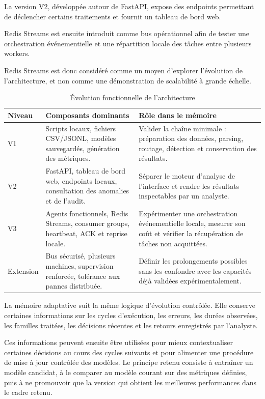 La version V2, développée autour de FastAPI, expose des endpoints permettant de déclencher certains traitements et fournit un tableau de bord web.

Redis Streams est ensuite introduit comme bus opérationnel afin de tester une orchestration événementielle et une répartition locale des tâches entre plusieurs workers.

Redis Streams est donc considéré comme un moyen d'explorer l'évolution de l'architecture, et non comme une démonstration de scalabilité à grande échelle.

\begin{table}[H]
\centering
\caption{Évolution fonctionnelle de l'architecture}
\label{tab:evolution-architecture}
\scriptsize
\begin{tabularx}{\textwidth}{p{2.2cm}p{4.0cm}X}
\toprule
\textbf{Niveau} & \textbf{Composants dominants} & \textbf{Rôle dans le mémoire} \tabularnewline
\midrule
V1 &
Scripts locaux, fichiers CSV/JSONL, modèles sauvegardés, génération des métriques. &
Valider la chaîne minimale : préparation des données, parsing, routage, détection et conservation des résultats. \tabularnewline
V2 &
FastAPI, tableau de bord web, endpoints locaux, consultation des anomalies et de l'audit. &
Séparer le moteur d'analyse de l'interface et rendre les résultats inspectables par un analyste. \tabularnewline
V3 &
Agents fonctionnels, Redis Streams, consumer groups, heartbeat, ACK et reprise locale. &
Expérimenter une orchestration événementielle locale, mesurer son coût et vérifier la récupération de tâches non acquittées. \tabularnewline
Extension &
Bus sécurisé, plusieurs machines, supervision renforcée, tolérance aux pannes distribuée. &
Définir les prolongements possibles sans les confondre avec les capacités déjà validées expérimentalement. \tabularnewline
\bottomrule
\end{tabularx}
\end{table}

La mémoire adaptative suit la même logique d'évolution contrôlée. Elle conserve certaines informations sur les cycles d'exécution, les erreurs, les durées observées, les familles traitées, les décisions récentes et les retours enregistrés par l'analyste.

Ces informations peuvent ensuite être utilisées pour mieux contextualiser certaines décisions au cours des cycles suivants et pour alimenter une procédure de mise à jour contrôlée des modèles. Le principe retenu consiste à entraîner un modèle candidat, à le comparer au modèle courant sur des métriques définies, puis à ne promouvoir que la version qui obtient les meilleures performances dans le cadre retenu.

